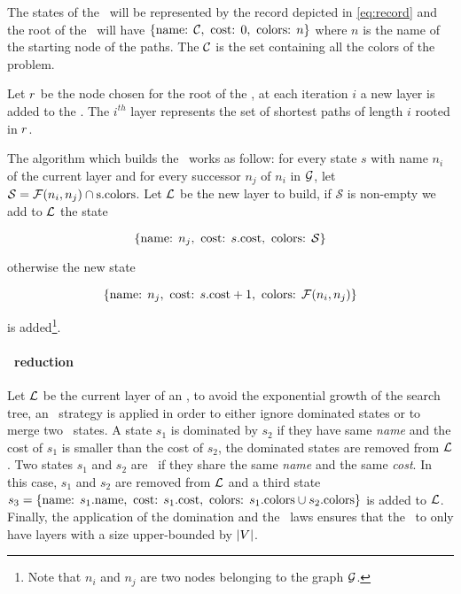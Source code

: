 The states of the \mdd\ will be represented by the record depicted in \cref{eq:record} and the root of the \mdd\ will have $\{\text{name: } \mathcal{C}, \text{ cost: } 0, \text{ colors: } n \}$ where $n$ is the name of the starting node of the paths. The $\mathcal{C}$ is the set containing all the colors of the problem.

Let $r$ be the node chosen for the root of the \mdd, at each iteration $i$ a new layer is added to the \mdd. The $i^{th}$ layer represents the set of shortest paths of length $i$ rooted in $r$.

\def\currState{s}
\def\currStateName{n_i}
\def\nextState{n_j}

The algorithm which builds the \mdd\ works as follow: for every state $\currState$ with name $\currStateName$ of the current layer and for every successor $\nextState$ of $\currStateName$ in $\mathcal{G}$, let $\mathcal{S} = \colf(\currStateName, \nextState) \cap \text{\currState.colors}$. Let $\mathcal{L}$ be the new layer to build, if $\mathcal{S}$ is non-empty we add to $\mathcal{L}$ the state

$$\mddState{\nextState}{\currState\text{.cost}}{\mathcal{S}}$$

otherwise the new state

$$\mddState{\nextState}{\currState\text{.cost} + 1}{\colf(\currStateName, \nextState)}$$

is added\footnote{Note that $\currStateName$ and $\nextState$ are two nodes belonging to the graph $\mathcal{G}$.}.

\paragraph{\mdd\ reduction} Let $\mathcal{L}$ be the current layer of an \mdd, to avoid the exponential growth of the search tree, an \adhoc\ strategy is applied in order to either ignore dominated states or to merge two \compatibleState\ states. A state $s_1$ is dominated by $s_2$ if they have same \textit{name} and the cost of $s_1$ is smaller than the cost of $s_2$, the dominated states are removed from $\mathcal{L}$. Two states $s_1$ and $s_2$ are \compatibleState\ if they share the same \textit{name} and the same \textit{cost}. In this case, $s_1$ and $s_2$ are removed from $\mathcal{L}$ and a third state $s_3 = \{\text{name: } s_1\text{.name}, \text{ cost: } s_1.\text{cost}, \text{ colors: } s_1\text{.colors} \cup s_2\text{.colors} \}$ is added to $\mathcal{L}$.\\
Finally, the application of the domination and the \compatibleState\ laws ensures that the \mdd\ to only have layers with a size upper-bounded by $|V|$.

